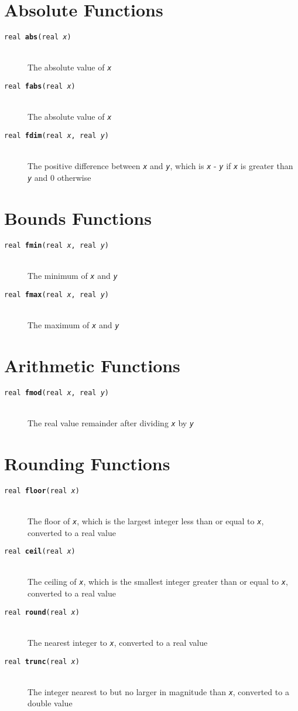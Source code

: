 \documentclass[10pt]{report}
\newcommand{\fitem}[4]{\item[{\tt #1 {\bfseries #2}(#3)}]\mbox{ } \\[4pt] #4}
\newcommand{\farg}[1]{{\tt\slshape #1}}
\begin{document}
\section{Absolute Functions}

\begin{description}
%
\fitem{real}{abs}{real \farg{x}}{
The absolute value of \farg{x}}
%
\fitem{real}{fabs}{real \farg{x}}{
The absolute value of \farg{x}}
%
\fitem{real}{fdim}{real \farg{x}, 
                 real \farg{y}}{
The positive difference between \farg{x} and \farg{y}, which is
\farg{x} - \farg{y} if \farg{x} is greater than \farg{y} and 0 otherwise}
%
\end{description}

\section{Bounds Functions}

\begin{description}
%
\fitem{real}{fmin}{real \farg{x}, real \farg{y}}{
The minimum of \farg{x} and \farg{y}}
%
\fitem{real}{fmax}{real \farg{x}, real \farg{y}}{
The maximum of \farg{x} and \farg{y}}
%
\end{description}

\section{Arithmetic Functions}
%
\begin{description}
\fitem{real}{fmod}{real \farg{x}, real \farg{y}}{
The real value remainder after dividing \farg{x} by \farg{y}}
%
\end{description}

\section{Rounding Functions}

\begin{description}
%
\fitem{real}{floor}{real \farg{x}}{
The floor of \farg{x}, which is the largest integer less
than or equal to \farg{x}, converted to a real value}
%
\fitem{real}{ceil}{real \farg{x}}{
The ceiling of \farg{x}, which is the smallest integer greater
than or equal to \farg{x}, converted to a real value}
%
\fitem{real}{round}{real \farg{x}}{
The nearest integer to \farg{x}, converted to a real value}
%
\fitem{real}{trunc}{real \farg{x}}{
The integer nearest to but no larger in magnitude than \farg{x},
converted to a double value}
%
\end{description}
\end{document}
